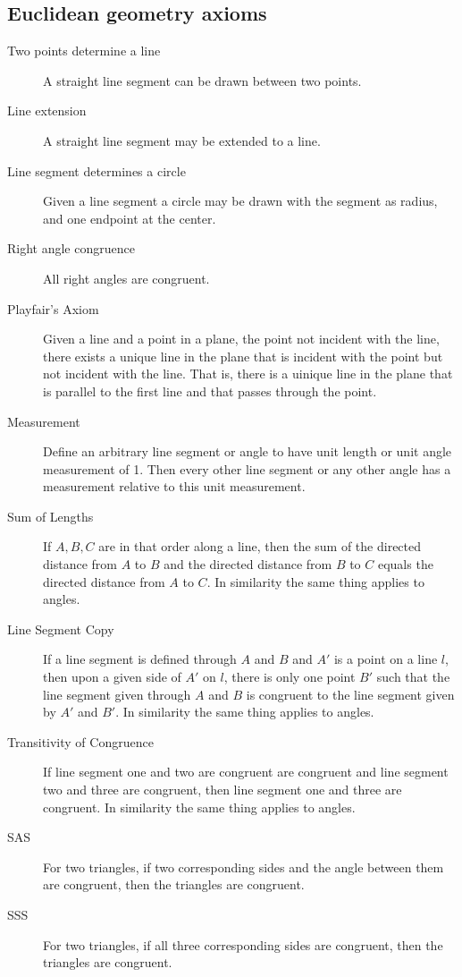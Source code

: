 \documentclass[12pt]{amsart}
\theoremstyle{remark}
\newtheorem*{basic notion}{Basic Notion}
\begin{document}
\subsection{Euclidean geometry axioms}
\begin{description}
\item[Two points determine a line] A straight line segment can be drawn between two points.
\item[Line extension] A straight line segment may be extended to a line.
\item[Line segment determines a circle] Given a line segment a circle may be drawn with the segment as radius, and one endpoint at the center.
\item[Right angle congruence] All right angles are congruent.
\item[Playfair's Axiom] Given a line and a point in a plane, the point not incident with the line, there exists a unique line in the plane that is incident with the point but not incident with the line. That is, there is a uinique line in the plane that is parallel to the first line and that passes through the point.
\item[Measurement] Define an arbitrary line segment or angle to have unit length or unit angle measurement of 1. Then every other line segment or any other angle has a measurement relative to this unit measurement.
\item[Sum of Lengths] If $A, B, C$ are in that order along a line, then the sum of the directed distance from $A$ to $B$ and the directed distance from $B$ to $C$ equals the directed distance from  $A$ to $C$. In similarity the same thing applies to angles.
\item[Line Segment Copy] If  a line segment is defined through $A$ and $B$ and $A'$ is a point on a line $l$, then upon a given side of $A'$ on $l$, there is only one point $B'$ such that the line segment given through $A$ and $B$ is congruent to the line segment given by $A'$ and $B'$. In similarity the same thing applies to angles.
\item[Transitivity of Congruence] If line segment one and two are congruent are congruent and line segment two and three are congruent, then line segment one and three are congruent. In similarity the same thing applies to angles.
\item[SAS] For two triangles, if two corresponding sides and the angle between them are congruent, then the triangles are congruent.
\item[SSS] For two triangles, if all three corresponding sides are congruent, then the triangles are congruent.
\end{description}
\end{document}
